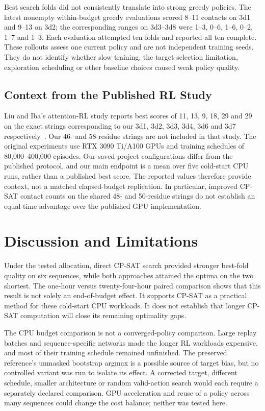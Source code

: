 \documentclass{article}
\theoremstyle{plain}
\theoremstyle{definition}
\begin{document}
Best search folds did not consistently translate into strong greedy policies. The latest nonempty within-budget greedy evaluations scored 8--11 contacts on 3d1 and 9--13 on 3d2; the corresponding ranges on 3d3--3d8 were 1--3, 0--6, 1--6, 0--2, 1--7 and 1--3. Each evaluation attempted ten folds and reported all ten complete. These rollouts assess one current policy and are not independent training seeds. They do not identify whether slow training, the target-selection limitation, exploration scheduling or other baseline choices caused weak policy quality.

\subsection{Context from the Published RL Study}
Liu and Iba's attention-RL study reports best scores of 11, 13, 9, 18, 29 and 29 on the exact strings corresponding to our 3d1, 3d2, 3d3, 3d4, 3d6 and 3d7 respectively~\cite{AttnDRL2504}. Our 46- and 58-residue strings are not included in that study. The original experiments use RTX 3090 Ti/A100 GPUs and training schedules of 80,000--400,000 episodes. Our saved project configurations differ from the published protocol, and our main endpoint is a mean over five cold-start CPU runs, rather than a published best score. The reported values therefore provide context, not a matched elapsed-budget replication. In particular, improved CP-SAT contact counts on the shared 48- and 50-residue strings do not establish an equal-time advantage over the published GPU implementation.

\section{Discussion and Limitations}\label{sec:discussion}
Under the tested allocation, direct CP-SAT search provided stronger best-fold quality on six sequences, while both approaches attained the optima on the two shortest. The one-hour versus twenty-four-hour paired comparison shows that this result is not solely an end-of-budget effect. It supports CP-SAT as a practical method for these cold-start CPU workloads. It does not establish that longer CP-SAT computation will close its remaining optimality gaps.

The CPU budget comparison is not a converged-policy comparison. Large replay batches and sequence-specific networks made the longer RL workloads expensive, and most of their training schedule remained unfinished. The preserved reference's unmasked bootstrap argmax is a possible source of target bias, but no controlled variant was run to isolate its effect. A corrected target, different schedule, smaller architecture or random valid-action search would each require a separately declared comparison. GPU acceleration and reuse of a policy across many sequences could change the cost balance; neither was tested here.
\end{document}
